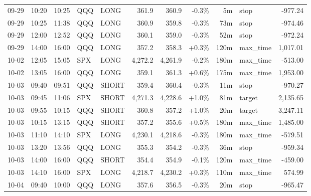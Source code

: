 \documentclass[11pt,a4paper,twoside]{article}
\begin{document}
\begin{center}
\begin{longtable}{>{\color{txtmain}}l l l l l r r r r >{\color{txtmain}}l r}
09-29 & 10:20 & 10:25 & QQQ & LONG & 361.9 & 360.9 & \textcolor{lossred}{-0.3\%} & 5m & stop & \textcolor{lossred}{-977.24} \\
09-29 & 10:25 & 11:38 & QQQ & LONG & 360.9 & 359.8 & \textcolor{lossred}{-0.3\%} & 73m & stop & \textcolor{lossred}{-974.46} \\
09-29 & 12:00 & 12:52 & QQQ & LONG & 360.1 & 359.0 & \textcolor{lossred}{-0.3\%} & 52m & stop & \textcolor{lossred}{-972.24} \\
09-29 & 14:00 & 16:00 & QQQ & LONG & 357.2 & 358.3 & \textcolor{wingreen}{+0.3\%} & 120m & max\_time & \textcolor{wingreen}{1,017.01} \\
10-02 & 12:05 & 15:05 & SPX & LONG & 4,272.2 & 4,261.9 & \textcolor{lossred}{-0.2\%} & 180m & max\_time & \textcolor{lossred}{-513.00} \\
10-02 & 13:05 & 16:00 & QQQ & LONG & 359.1 & 361.3 & \textcolor{wingreen}{+0.6\%} & 175m & max\_time & \textcolor{wingreen}{1,953.00} \\
10-03 & 09:40 & 09:51 & QQQ & SHORT & 359.4 & 360.4 & \textcolor{lossred}{-0.3\%} & 11m & stop & \textcolor{lossred}{-970.27} \\
10-03 & 09:45 & 11:06 & SPX & SHORT & 4,271.3 & 4,228.6 & \textcolor{wingreen}{+1.0\%} & 81m & target & \textcolor{wingreen}{2,135.65} \\
10-03 & 09:55 & 10:15 & QQQ & SHORT & 360.8 & 357.2 & \textcolor{wingreen}{+1.0\%} & 20m & target & \textcolor{wingreen}{3,247.11} \\
10-03 & 10:15 & 13:15 & QQQ & SHORT & 357.2 & 355.6 & \textcolor{wingreen}{+0.5\%} & 180m & max\_time & \textcolor{wingreen}{1,485.00} \\
10-03 & 11:10 & 14:10 & SPX & LONG & 4,230.1 & 4,218.6 & \textcolor{lossred}{-0.3\%} & 180m & max\_time & \textcolor{lossred}{-579.51} \\
10-03 & 13:20 & 13:56 & QQQ & LONG & 355.3 & 354.2 & \textcolor{lossred}{-0.3\%} & 36m & stop & \textcolor{lossred}{-959.34} \\
10-03 & 14:00 & 16:00 & QQQ & SHORT & 354.4 & 354.9 & \textcolor{lossred}{-0.1\%} & 120m & max\_time & \textcolor{lossred}{-459.00} \\
10-03 & 14:10 & 16:00 & SPX & LONG & 4,218.7 & 4,230.2 & \textcolor{wingreen}{+0.3\%} & 110m & max\_time & \textcolor{wingreen}{574.99} \\
10-04 & 09:40 & 10:00 & QQQ & LONG & 357.6 & 356.5 & \textcolor{lossred}{-0.3\%} & 20m & stop & \textcolor{lossred}{-965.47} \\

\end{longtable}
\end{center}
\end{document}
